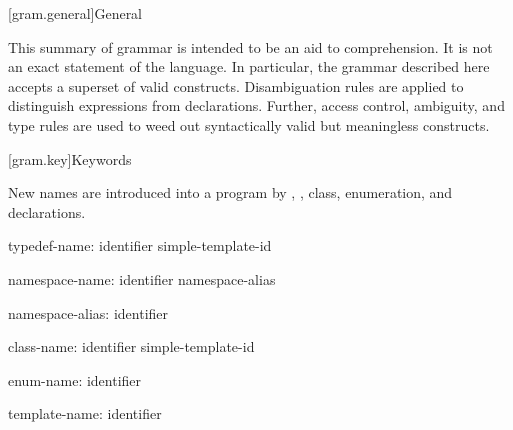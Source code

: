 
[gram.general]{General}

\pnum
{}%
%
This summary of \Cpp{} grammar is intended to be an aid to comprehension.
It is not an exact statement of the language.
In particular, the grammar described here accepts
a superset of valid \Cpp{} constructs.
Disambiguation rules
are applied to distinguish expressions from declarations.
Further, access control, ambiguity, and type rules are used
to weed out syntactically valid but meaningless constructs.

[gram.key]{Keywords}

\pnum
{}%
New names are introduced into a program by
,
,
class, enumeration, and
declarations.

\begin{ncbnf}
typedef-name:\br
	identifier\br
	simple-template-id
\end{ncbnf}

\begin{ncbnf}
namespace-name:\br
	identifier\br
	namespace-alias
\end{ncbnf}

\begin{ncbnf}
namespace-alias:\br
	identifier
\end{ncbnf}

\begin{ncbnf}
class-name:\br
	identifier\br
	simple-template-id
\end{ncbnf}

\begin{ncbnf}
enum-name:\br
	identifier
\end{ncbnf}

\begin{ncbnf}
template-name:\br
	identifier
\end{ncbnf}


